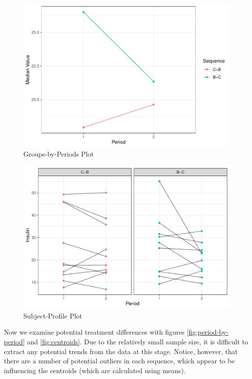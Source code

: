 \begin{figure}
\centering
\includegraphics{ch4_files/figure-latex/groups-by-periods-1.pdf}
\caption{Groups-by-Periods Plot}
\end{figure}

\begin{figure}
\centering
\includegraphics{ch4_files/figure-latex/subject-profile-1.pdf}
\caption{Subject-Profile Plot}
\end{figure}

Now we examine potential treatment differences with figures
\ref{fig:period-by-period} and \ref{fig:centroids}. Due to the
relatively small sample size, it is difficult to extract any potential
trends from the data at this stage. Notice, however, that there are a
number of potential outliers in each sequence, which appear to be
influencing the centroids (which are calculated using means).

